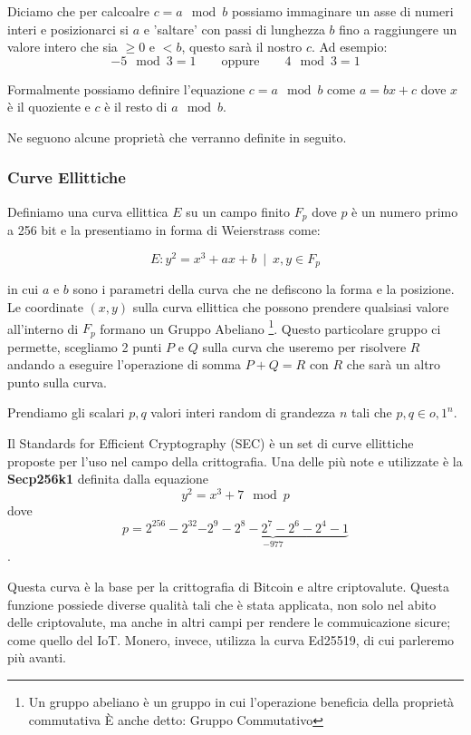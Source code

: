 \documentclass[12pt,a4paper]{article}
\begin{document}
Diciamo che per calcoalre $ c = a \mod{b} $ possiamo immaginare un asse di
numeri interi e posizionarci si $ a $ e 'saltare' con passi di lunghezza $ b $
fino a raggiungere un valore intero che sia $ \ge 0 $ e $ < b $, questo sarà il
nostro $ c $. Ad esempio:
$$ -5 \mod{3} = 1 \qquad \text{oppure} \qquad 4 \mod 3 = 1 $$

Formalmente possiamo definire l'equazione $ c = a \mod{b} $ come $ a = bx + c $
dove $ x $ è il quoziente e $ c $ è il resto di $ a \mod b $.

Ne seguono alcune proprietà che verranno definite in seguito.

\subsubsection{Curve Ellittiche}
Definiamo una curva ellittica $ E $ su un campo finito $ F_p $ dove $ p $ è un
numero primo a 256 bit e la presentiamo in forma di Weierstrass come:

$$ E: y^2 = x^3 + ax + b \enspace | \enspace x, y \in F_p $$

in cui $ a $ e $ b $ sono i parametri della curva che ne defiscono la forma e la
posizione. Le coordinate $ (x,y) $ sulla curva ellittica che possono prendere
qualsiasi valore all'interno di $F_p$ formano un Gruppo Abeliano \footnote{Un
gruppo abeliano è un gruppo in cui l'operazione beneficia della proprietà
commutativa È anche detto: Gruppo Commutativo}. Questo particolare gruppo ci
permette, scegliamo 2 punti $ P $ e $ Q $ sulla curva che useremo per risolvere
$ R $ andando a eseguire l'operazione di somma $ P + Q = R $ con $ R $ che sarà
un altro punto sulla curva.

Prendiamo gli scalari $p, q$ valori interi random di grandezza $n$ tali che $ p,
q \in {o,1}^n $.

Il Standards for Efficient Cryptography (SEC) è un set di curve ellittiche
proposte per l'uso nel campo della crittografia. Una delle più note e utilizzate
è la \textbf{Secp256k1} definita dalla equazione
$$ y^2 = x^3 + 7 \mod{p} $$ dove 
$$ p = 2^{256} - 2^{32} \underbrace{- 2^9 - 2^8 - 2^7 - 2^6 - 2^4 - 1}_{-977}
$$.

Questa curva è la base per la crittografia di Bitcoin e altre criptovalute.
Questa funzione possiede diverse qualità tali che è stata applicata, non solo
nel abito delle criptovalute, ma anche in altri campi per rendere le
commuicazione sicure; come quello del IoT. Monero, invece, utilizza la curva
Ed25519, di cui parleremo più avanti.
\end{document}
